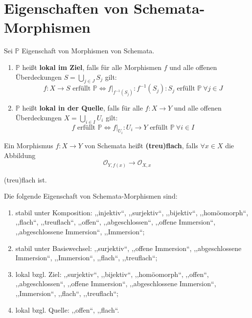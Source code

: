 \section{Eigenschaften von Schemata-Morphismen}
\begin{notation}[21]
  Sei $\mathbb{P}$ Eigenschaft von Morphismen von Schemata.
  \begin{enumerate}
  \item $\mathbb{P}$ heißt \textbf{lokal im Ziel}, falls für alle Morphismen
    $f$ und alle offenen Überdeckungen $S=\bigcup_{j\in J}S_{j}$ gilt:
    \[
      f:X\rightarrow S\text{ erfüllt }\mathbb{P}\Longleftrightarrow f|_{f^{-1}(S_{j})}:f^{-1}(S_{j}):S_{j}\text{ erfüllt }\mathbb{P}\ \forall j\in J
    \]
  \item $\mathbb{P}$ heißt \textbf{lokal in der Quelle}, falls für alle $f:X\rightarrow Y$
    und alle offenen Überdeckungen $X=\bigcup_{i\in I}U_{i}$ gilt:
    \[
      f\text{ erfüllt }\mathbb{P}\Longleftrightarrow f|_{U_{i}}:U_{i}\rightarrow Y\text{ erfüllt }\mathbb{P}\ \forall i\in I
    \]
  \end{enumerate}
\end{notation}

\begin{defn*}
  Ein Morphismus $f:X\rightarrow Y$ von Schemata heißt \textbf{(treu)flach},
  falls $\forall x\in X$ die Abbildung
  \[
    \mathcal{O}_{Y,f(x)}\longrightarrow\mathcal{O}_{X,x}
  \]

  (treu)flach ist.
\end{defn*}
\begin{prop}[22]
  Die folgende Eigenschaft von Schemata-Morphismen sind:
  \begin{enumerate}
  \item stabil unter Komposition: ,,injektiv``, ,,surjektiv``, ,,bijektiv``,
    ,,homöomorph``, ,,flach``, ,,treuflach``, ,,offen``, ,,abgeschlossen``,
    ,,offene Immersion``, ,,abgeschlossene Immersion``, ,,Immersion``;
  \item stabil unter Basiswechsel: ,,surjektiv``, ,,offene Immersion``,
    ,,abgeschlossene Immersion``, ,,Immersion``, ,,flach``, ,,treuflach``;
  \item lokal bzgl. Ziel: ,,surjektiv``, ,,bijektiv``, ,,homöomorph``,
    ,,offen``, ,,abgeschlossen``, ,,offene Immersion``, ,,abgeschlossene
    Immersion``, ,,Immersion``, ,,flach``, ,,treuflach``;
  \item lokal bzgl. Quelle: ,,offen``, ,,flach``.
  \end{enumerate}
\end{prop}

